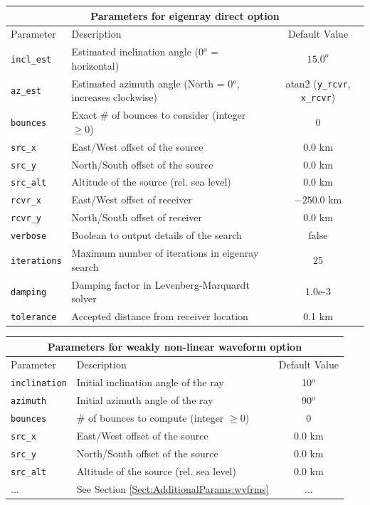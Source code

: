 \documentclass[10pt]{article}
\begin{document}
\begin{tabular}{ | l | l | c | }
  \hline
  \multicolumn{3}{|c|}{\textbf{Parameters for eigenray direct option}} \\
  \hline
  Parameter & Description & Default Value \\
  \hline \hline
 \verb=incl_est= 		& Estimated inclination angle (0\(^o\) = horizontal)		& \(15.0^o\)	\\
 \verb=az_est= 		& Estimated azimuth angle (North = 0\(^o\), increases clockwise)		& atan2 (\verb=y_rcvr=, \verb=x_rcvr=) \\ \hline
 \verb=bounces=		& Exact \# of bounces to consider (integer \(\geq 0\)) 	& 0 \\ \hline
 \verb=src_x=  			& East/West offset of the source						& \(0.0\) km \\
 \verb=src_y=  			& North/South offset of the source						& \(0.0\) km \\
 \verb=src_alt=  		& Altitude of the source (rel. sea level)					& \(0.0\) km \\ \hline
 \verb=rcvr_x= 			& East/West offset of receiver							& \(-250.0\) km	\\
 \verb=rcvr_y= 			& North/South offset of receiver							& \(0.0\) km \\ \hline
 \verb=verbose=		& Boolean to output details of the search					& false \\
 \verb=iterations=		& Maximum number of iterations in eigenray search			& 25 \\ 
 \verb=damping=		& Damping factor in Levenberg-Marquardt solver			& 1.0e-3 \\
 \verb=tolerance=		& Accepted distance from receiver location				& 0.1 km \\ \hline
\end{tabular}

\vspace{0.01\textheight}

\begin{tabular}{ | l | l | c | }
  \hline
  \multicolumn{3}{|c|}{\textbf{Parameters for weakly non-linear waveform option}} \\
  \hline
  Parameter & Description & Default Value \\
 \hline \hline
 \verb=inclination=		& Initial inclination angle of the ray					& 10\(^o\) \\
 \verb=azimuth=		& Initial azimuth angle of the ray					& 90\(^o\) \\
 \verb=bounces=		& \# of bounces to compute (integer \(\geq 0\)) 			& 0 \\ \hline
 
 \verb=src_x=  			& East/West offset of the source						& \(0.0\) km \\
 \verb=src_y=  			& North/South offset of the source						& \(0.0\) km \\
 \verb=src_alt=  		& Altitude of the source (rel. sea level)					& \(0.0\) km \\ \hline
 ...					& See Section \ref{Sect:AdditionalParams:wvfrms}		& ... \\ \hline
\end{tabular}
\end{document}
